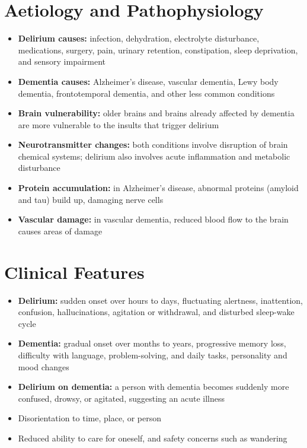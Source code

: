 \section*{Aetiology and Pathophysiology}
\begin{itemize}
    \item \textbf{Delirium causes:} infection, dehydration, electrolyte disturbance, medications, surgery, pain, urinary retention, constipation, sleep deprivation, and sensory impairment
    \item \textbf{Dementia causes:} Alzheimer's disease, vascular dementia, Lewy body dementia, frontotemporal dementia, and other less common conditions
    \item \textbf{Brain vulnerability:} older brains and brains already affected by dementia are more vulnerable to the insults that trigger delirium
    \item \textbf{Neurotransmitter changes:} both conditions involve disruption of brain chemical systems; delirium also involves acute inflammation and metabolic disturbance
    \item \textbf{Protein accumulation:} in Alzheimer's disease, abnormal proteins (amyloid and tau) build up, damaging nerve cells
    \item \textbf{Vascular damage:} in vascular dementia, reduced blood flow to the brain causes areas of damage
\end{itemize}

\section*{Clinical Features}
\begin{itemize}
    \item \textbf{Delirium:} sudden onset over hours to days, fluctuating alertness, inattention, confusion, hallucinations, agitation or withdrawal, and disturbed sleep-wake cycle
    \item \textbf{Dementia:} gradual onset over months to years, progressive memory loss, difficulty with language, problem-solving, and daily tasks, personality and mood changes
    \item \textbf{Delirium on dementia:} a person with dementia becomes suddenly more confused, drowsy, or agitated, suggesting an acute illness
    \item Disorientation to time, place, or person
    \item Reduced ability to care for oneself, and safety concerns such as wandering
\end{itemize}

